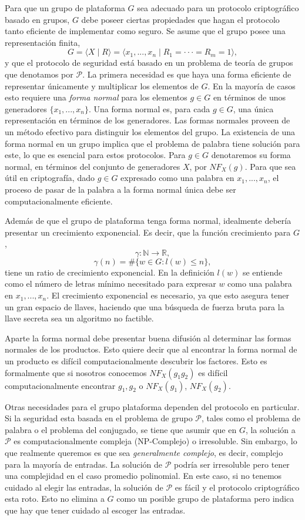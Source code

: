 \documentclass[12pt]{book}
\theoremstyle{definition}
\begin{document}
Para que un grupo de plataforma $G$ sea adecuado para un protocolo criptográfico basado en grupos, $G$ debe poseer ciertas propiedades que hagan el protocolo tanto eficiente de implementar como seguro. Se asume que el grupo posee una representación finita,
$$G = \langle X\mid R\rangle=\langle x_1,...,x_n\mid R_1=\cdot\cdot\cdot=R_m=1\rangle,$$
y que el protocolo de seguridad está basado en un problema de teoría de grupos que denotamos por $\mathcal{P}$. La primera necesidad es que haya una forma eficiente de representar únicamente y multiplicar los elementos de $G$. En la mayoría de casos esto requiere una \textit{forma normal} para los elementos $g\in G$ en términos de unos generadores $\{x_1,...,x_n\}$. Una forma normal es, para cada $g\in G$, una única representación en términos de los generadores. Las formas normales proveen de un método efectivo para distinguir los elementos del grupo. La existencia de una forma normal en un grupo implica que el problema de palabra tiene solución para este, lo que es esencial para estos protocolos. Para $g\in G$ denotaremos su forma normal, en términos del conjunto de generadores $X$, por $NF_X(g)$. Para que sea útil en criptografía, dado $g\in G$ expresado como una palabra en $x_1,...,x_n$, el proceso de pasar de la palabra a la forma normal única debe ser computacionalmente eficiente.

Además de que el grupo de plataforma tenga forma normal, idealmente debería presentar un crecimiento exponencial. Es decir, que la función crecimiento para $G$,
$$\gamma:\mathbb{N}\rightarrow\mathbb{R},$$
$$\gamma(n)=\#\{w\in G:l(w)\leq n\},$$
tiene un ratio de crecimiento exponencial. En la definición $l(w)$ se entiende como el número de letras mínimo necesitado para expresar $w$ como una palabra en $x_1,...,x_n$. El crecimiento exponencial es necesario, ya que esto asegura tener un gran espacio de llaves, haciendo que una búsqueda de fuerza bruta para la llave secreta sea un algoritmo no factible.

Aparte la forma normal debe presentar buena difusión al determinar las formas normales de los productos. Esto quiere decir que al encontrar la forma normal de un producto es difícil computacionalmente descubrir los factores. Esto es formalmente que si nosotros conocemos $NF_X(g_1g_2)$ es difícil computacionalmente encontrar $g_1,g_2$ o $NF_X(g_1)$, $NF_X(g_2)$.

Otras necesidades para el grupo plataforma dependen del protocolo en particular. Si la seguridad esta basada en el problema de grupo $\mathcal{P}$, tales como el problema de palabra o el problema del conjugado, se tiene que asumir que en $G$, la solución a $\mathcal{P}$ es computacionalmente compleja (NP-Complejo) o irresoluble. Sin embargo, lo que realmente queremos es que sea \textit{generalmente complejo}, es decir, complejo para la mayoría de entradas. La solución de $\mathcal{P}$ podría ser irresoluble pero tener una complejidad en el caso promedio polinomial. En este caso, si no tenemos cuidado al elegir las entradas, la solución de $\mathcal{P}$ es fácil y el protocolo criptográfico esta roto. Esto no elimina a $G$ como un posible grupo de plataforma pero indica que hay que tener cuidado al escoger las entradas.
\end{document}

